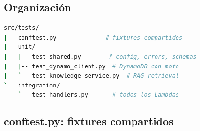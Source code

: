 \documentclass[11pt,a4paper,oneside]{article}
\begin{document}
\subsection{Organizaci\'on}

\begin{lstlisting}[language=bash,caption={Estructura}]
src/tests/
|-- conftest.py              # fixtures compartidos
|-- unit/
|   |-- test_shared.py        # config, errors, schemas
|   |-- test_dynamo_client.py  # DynamoDB con moto
|   `-- test_knowledge_service.py  # RAG retrieval
`-- integration/
    `-- test_handlers.py       # todos los Lambdas
\end{lstlisting}

\subsection{conftest.py: fixtures compartidos}
\end{document}
